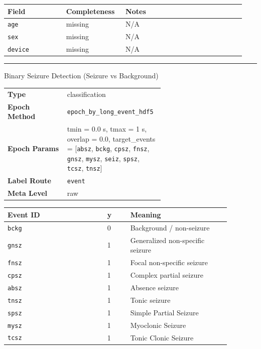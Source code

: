 {\begin{tcolorbox}
\begin{tabular}{@{}p{0.2350\linewidth}p{0.2350\linewidth}p{0.4700\linewidth}@{}}
\toprule
\textbf{Field} & \textbf{Completeness} & \textbf{Notes} \\
\midrule
\texttt{age} & missing & N/A \\
\texttt{sex} & missing & N/A \\
\texttt{device} & missing & N/A \\
\bottomrule
\end{tabular}
\endgroup
\noindent\rule{\linewidth}{0.7pt}\par\nopagebreak
{}
 {\footnotesize Binary Seizure Detection (Seizure vs Background)}\par\smallskip
{\footnotesize\begin{tabular}{@{}lp{0.62\linewidth}@{}}
\textbf{Type} & classification \\
\textbf{Epoch Method} & \texttt{epoch\_by\_long\_event\_hdf5} \\
\textbf{Epoch Params} & tmin = 0.0 s, tmax = 1 s, overlap = 0.0, target\_events = [\texttt{absz}, \texttt{bckg}, \texttt{cpsz}, \texttt{fnsz}, \texttt{gnsz}, \texttt{mysz}, \texttt{seiz}, \texttt{spsz}, \texttt{tcsz}, \texttt{tnsz}] \\
\textbf{Label Route} & \texttt{event} \\
\textbf{Meta Level} & raw \\
\end{tabular}}
\par{}\par\smallskip
\begingroup\footnotesize
\begin{tabular}{@{}p{0.3911\linewidth}p{0.0978\linewidth}p{0.3911\linewidth}@{}}
\toprule
\textbf{Event ID} & \textbf{y} & \textbf{Meaning} \\
\midrule
\texttt{bckg} & 0 & Background / non-seizure \\
\texttt{gnsz} & 1 & Generalized non-specific seizure \\
\texttt{fnsz} & 1 & Focal non-specific seizure \\
\texttt{cpsz} & 1 & Complex partial seizure \\
\texttt{absz} & 1 & Absence seizure \\
\texttt{tnsz} & 1 & Tonic seizure \\
\texttt{spsz} & 1 & Simple Partial Seizure \\
\texttt{mysz} & 1 & Myoclonic Seizure \\
\texttt{tcsz} & 1 & Tonic Clonic Seizure \\

\end{tabular}
\end{tcolorbox}}
